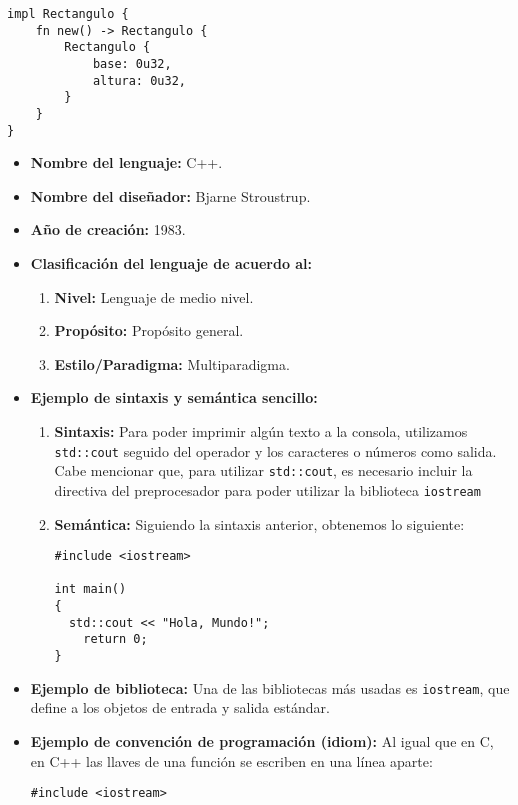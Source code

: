 \documentclass[11pt,letterpaper]{article}
\begin{document}
\begin{enumerate}
\begin{itemize}
\begin{itemize}
\begin{verbatim}
impl Rectangulo {
    fn new() -> Rectangulo {
        Rectangulo {
            base: 0u32,
            altura: 0u32,
        }
    }
}
\end{verbatim}
                \end{itemize}
                \begin{itemize}
                  \item \textbf{Nombre del lenguaje:} C++.
                  \item \textbf{Nombre del diseñador:} Bjarne Stroustrup.
                  \item \textbf{Año de creación:} 1983.
                  \item \textbf{Clasificación del lenguaje de acuerdo al:}
                        \begin{enumerate}
                          \item \textbf{Nivel:} Lenguaje de medio nivel.
                          \item \textbf{Propósito:} Propósito general.
                          \item \textbf{Estilo/Paradigma:} Multiparadigma.
                        \end{enumerate}
                  \item \textbf{Ejemplo de sintaxis y semántica sencillo:}
                        \begin{enumerate}
                          \item \textbf{Sintaxis:} Para poder imprimir algún
                                texto a la consola, utilizamos
                                \texttt{std::cout} seguido del operador
                                \texttt{\<\<} y los caracteres o números como
                                salida. Cabe mencionar que, para utilizar
                                \texttt{std::cout}, es necesario incluir la
                                directiva del preprocesador para poder utilizar
                                la biblioteca \texttt{iostream}
                          \item \textbf{Semántica:} Siguiendo la sintaxis
                                anterior, obtenemos lo siguiente:
\begin{verbatim}
#include <iostream>

int main()
{
  std::cout << "Hola, Mundo!";
    return 0;
}
\end{verbatim}
                        \end{enumerate}
                  \item \textbf{Ejemplo de biblioteca:} Una de las bibliotecas
                        más usadas es \texttt{iostream}, que define a los
                        objetos de entrada y salida estándar.
                  \item \textbf{Ejemplo de convención de programación (idiom):}
                        Al igual que en C, en C++ las llaves de una función se
                        escriben en una línea aparte:
\begin{verbatim}
#include <iostream>


\end{verbatim}
\end{itemize}
\end{itemize}
\end{enumerate}
\end{document}
